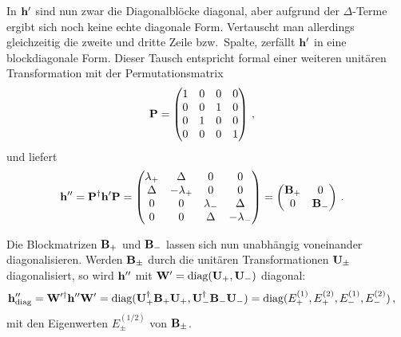 In $\mathbf{h}'$ sind nun zwar die Diagonalblöcke diagonal, aber aufgrund der $\Delta$-Terme ergibt sich noch keine echte diagonale Form.
Vertauscht man allerdings gleichzeitig die zweite und dritte Zeile bzw.\ Spalte, zerfällt $\mathbf{h}'$ in eine blockdiagonale Form. 
Dieser Tausch entspricht formal einer weiteren unitären Transformation mit der Permutationsmatrix
\begin{align}
    \mathbf{P} &= \begin{pmatrix}
        1 & 0 & 0 & 0 \\
        0 & 0 & 1 & 0 \\
        0 & 1 & 0 & 0 \\
        0 & 0 & 0 & 1
    \end{pmatrix} \, ,
\end{align}
und liefert
\begin{align}
    \mathbf{h}'' &= \mathbf{P}^\dagger \mathbf{h}' \mathbf{P} = \begin{pmatrix}
        \lambda_+ & \Delta & 0 & 0 \\
        \Delta & - \lambda_+ & 0 & 0 \\
        0 & 0 & \lambda_- & \Delta \\
        0 & 0 & \Delta & -\lambda_-
    \end{pmatrix} = \begin{pmatrix}
        \mathbf{B}_+ & 0 \\
        0 & \mathbf{B}_-
    \end{pmatrix} \, .
\end{align}

Die Blockmatrizen $\mathbf{B}_+$ und $\mathbf{B}_-$ lassen sich nun unabhängig voneinander diagonalisieren. Werden $\mathbf{B}_\pm$ durch die unitären Transformationen $\mathbf{U}_\pm$ diagonalisiert, so wird $\mathbf{h}''$ mit $\mathbf{W}' = \text{diag}(\mathbf{U}_+, \mathbf{U}_-)$ diagonal:
\begin{align}
    \mathbf{h}''_{\text{diag}} &= \mathbf{W}'^\dagger \mathbf{h}'' \mathbf{W}' = \text{diag}(\mathbf{U}_+^\dagger \mathbf{B}_+ \mathbf{U}_+, \mathbf{U}_-^\dagger \mathbf{B}_- \mathbf{U}_-) = \text{diag}(E_+^{(1)}, E_+^{(2)}, E_-^{(1)}, E_-^{(2)}) \, ,
\end{align}
mit den Eigenwerten $E_{\pm}^{(1/2)}$ von $\mathbf{B}_\pm$.

